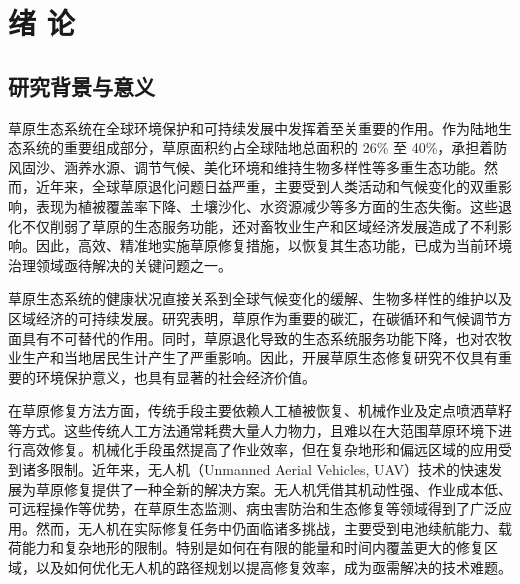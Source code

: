 \documentclass[AutoFakeBold]{LZUThesis}
\begin{document}
\mainmatter

\chapter{\texorpdfstring{绪 \quad 论}{绪论}}




\section{研究背景与意义}

草原生态系统在全球环境保护和可持续发展中发挥着至关重要的作用。作为陆地生态系统的重要组成部分，草原面积约占全球陆地总面积的 26\% 至 40\%\cite{chapin2013global}，承担着防风固沙、涵养水源、调节气候、美化环境和维持生物多样性等多重生态功能\cite{gibson2009grasses}。然而，近年来，全球草原退化问题日益严重，主要受到人类活动和气候变化的双重影响，表现为植被覆盖率下降、土壤沙化、水资源减少等多方面的生态失衡\cite{bai2020long}。这些退化不仅削弱了草原的生态服务功能，还对畜牧业生产和区域经济发展造成了不利影响。因此，高效、精准地实施草原修复措施，以恢复其生态功能，已成为当前环境治理领域亟待解决的关键问题之一\cite{freitag2021restoration}。

草原生态系统的健康状况直接关系到全球气候变化的缓解、生物多样性的维护以及区域经济的可持续发展。研究表明，草原作为重要的碳汇，在碳循环和气候调节方面具有不可替代的作用\cite{reinermann2020remote,dass2018grasslands}。同时，草原退化导致的生态系统服务功能下降，也对农牧业生产和当地居民生计产生了严重影响。因此，开展草原生态修复研究不仅具有重要的环境保护意义，也具有显著的社会经济价值。

在草原修复方法方面，传统手段主要依赖人工植被恢复、机械作业及定点喷洒草籽等方式。这些传统人工方法通常耗费大量人力物力，且难以在大范围草原环境下进行高效修复。机械化手段虽然提高了作业效率，但在复杂地形和偏远区域的应用受到诸多限制。近年来，无人机（Unmanned Aerial Vehicles, UAV）技术的快速发展为草原修复提供了一种全新的解决方案。无人机凭借其机动性强、作业成本低、可远程操作等优势，在草原生态监测、病虫害防治和生态修复等领域得到了广泛应用\cite{steffen2015planetary}。然而，无人机在实际修复任务中仍面临诸多挑战，主要受到电池续航能力、载荷能力和复杂地形的限制。特别是如何在有限的能量和时间内覆盖更大的修复区域，以及如何优化无人机的路径规划以提高修复效率，成为亟需解决的技术难题。
\end{document}

